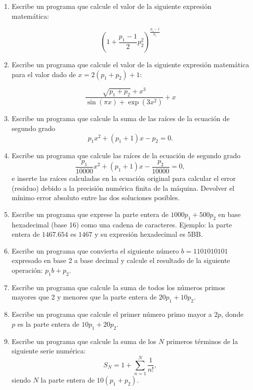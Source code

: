 \documentclass[11pt,a4paper]{article}
\begin{document}
\begin{enumerate} 
\item Escribe un programa que calcule el valor de la siguiente expresión matemática:

\begin{equation*}
\left( 1 + \frac{ p_1 - 1 }{2} p_2^2 \right)^\frac{ p_1 - 1 }{p_1}
\end{equation*}


\item Escribe un programa que calcule el valor de la siguiente expresión matemática para el valor dado de $x = 2 (p_1 + p_2) + 1$:

\begin{equation*}
\frac{\sqrt{p_1 + p_2} + x^3}{\sin(\pi x) + \exp(3 x^2)} + x
\end{equation*}


\item Escribe un programa que calcule la suma de las raíces de la ecuación de segundo grado 
$$
p_1 x^2 + (p_1 + 1)x - p_2 = 0.
$$


\item Escribe un programa que calcule las raíces de la ecuación de segundo grado 
$$
\frac{p_1}{10000} x^2 + (p_1 + 1)x - \frac{p_2}{10000} = 0,
$$ 
e inserte las raíces calculadas en la ecuación original para calcular el error (residuo) debido a la precisión numérica finita de la máquina. Devolver el mínimo error absoluto entre las dos soluciones posibles.


\item Escribe un programa que exprese la parte entera de $1000 p_1 + 500 p_2$ en base hexadecimal (base 16) como una cadena de caracteres. Ejemplo: la parte entera de $1467.654$ es $1467$ y su expresión hexadecimal es 5BB.


\item Escribe un programa que convierta el siguiente número $b = 1101010101$ expresado en base 2 a base decimal y calcule el resultado de la siguiente operación: $p_1 b + p_2$.


\item Escribe un programa que calcule la suma de todos los números primos mayores que 2 y menores que la parte entera de $20 p_1 + 10p_2$.


\item Escribe un programa que calcule el primer número primo mayor a $2p$, donde $p$ es la parte entera de $10 p_1 + 20 p_2$.


\item Escribe un programa que calcule la suma de los $N$ primeros términos de la siguiente serie numérica:
\begin{equation*}
S_N = 1 + \sum_{n=1}^N \frac{1}{n!},
\end{equation*}
siendo $N$ la parte entera de $10(p_1 + p_2)$.


\end{enumerate}
\end{document}
